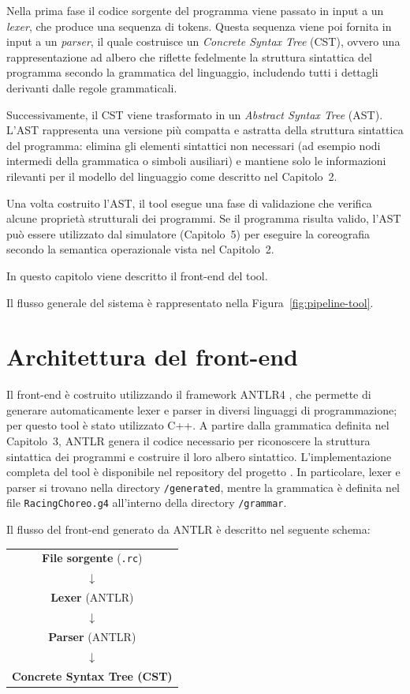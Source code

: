 Nella prima fase il codice sorgente del programma viene passato in input a un \textit{lexer}, che produce una sequenza di tokens. Questa sequenza viene poi fornita in input a un \textit{parser}, il quale costruisce un \textit{Concrete Syntax Tree} (CST), ovvero una rappresentazione ad albero che riflette fedelmente la struttura sintattica del programma secondo la grammatica del linguaggio, includendo tutti i dettagli derivanti dalle regole grammaticali.

Successivamente, il CST viene trasformato in un \textit{Abstract Syntax Tree} (AST). L’AST rappresenta una versione più compatta e astratta della struttura sintattica del programma: elimina gli elementi sintattici non necessari (ad esempio nodi intermedi della grammatica o simboli ausiliari) e mantiene solo le informazioni rilevanti per il modello del linguaggio come descritto nel Capitolo~2.

Una volta costruito l’AST, il tool esegue una fase di validazione che verifica alcune proprietà strutturali dei programmi. Se il programma risulta valido, l’AST può essere utilizzato dal simulatore (Capitolo~5) per eseguire la coreografia secondo la semantica operazionale vista nel Capitolo~2.

In questo capitolo viene descritto il front-end del tool.

Il flusso generale del sistema è rappresentato nella Figura~\ref{fig:pipeline-tool}.

\section{Architettura del front-end}

Il front-end è costruito utilizzando il framework ANTLR4 \cite{antlr4tool}, che permette di generare automaticamente lexer e parser in diversi linguaggi di programmazione; per questo tool è stato utilizzato C++. A partire dalla grammatica definita nel Capitolo~3, ANTLR genera il codice necessario per riconoscere la struttura sintattica dei programmi e costruire il loro albero sintattico. L’implementazione completa del tool è disponibile nel repository del progetto \cite{rcparserrepo}. In particolare, lexer e parser si trovano nella directory \texttt{/generated}, mentre la grammatica è definita nel file \texttt{RacingChoreo.g4} all’interno della directory \texttt{/grammar}.

Il flusso del front-end generato da ANTLR è descritto nel seguente schema:

\begin{center}
\begin{tabular}{c}
\textbf{File sorgente} (\texttt{.rc}) \\
$\downarrow$ \\
\textbf{Lexer} (ANTLR) \\
$\downarrow$ \\
\textbf{Parser} (ANTLR) \\
$\downarrow$ \\
\textbf{Concrete Syntax Tree (CST)}
\end{tabular}
\end{center}

